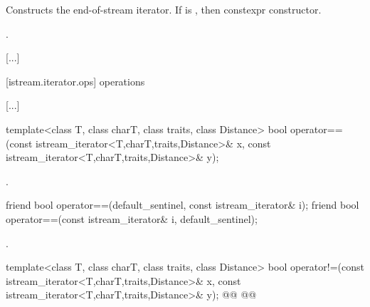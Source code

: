 \begin{itemdescr}
\pnum
\effects
Constructs the end-of-stream iterator.
If  is ,
then  constexpr
constructor.

\pnum
\ensures {}.
\end{itemdescr}

[...]

[istream.iterator.ops]{ operations}

[...]

\setcounter{Paras}{7}
%
\begin{itemdecl}
template<class T, class charT, class traits, class Distance>
  bool operator==(const istream_iterator<T,charT,traits,Distance>& x,
                  const istream_iterator<T,charT,traits,Distance>& y);
\end{itemdecl}

\begin{itemdescr}
\pnum
\returns
{}.
\end{itemdescr}

\begin{addedblock}
%
\begin{itemdecl}
friend bool operator==(default_sentinel, const istream_iterator& i);
friend bool operator==(const istream_iterator& i, default_sentinel);
\end{itemdecl}

\begin{itemdescr}
\pnum
\returns
{}.
\end{itemdescr}
\end{addedblock}

%
\begin{itemdecl}
template<class T, class charT, class traits, class Distance>
  bool operator!=(const istream_iterator<T,charT,traits,Distance>& x,
                  const istream_iterator<T,charT,traits,Distance>& y);
@@
@@
\end{itemdecl}

\begin{itemdescr}
\pnum
\returns
{}
\end{itemdescr}


